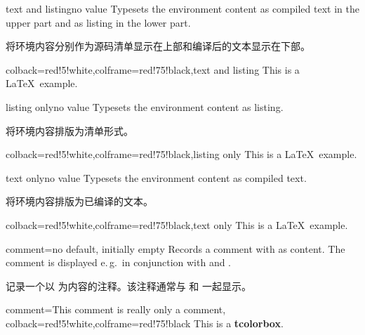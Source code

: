 \begin{docTcbKey}{text and listing}{}{no value}
Typesets the environment content as compiled text in the upper part and
as listing in the lower part.

将环境内容分别作为源码清单显示在上部和编译后的文本显示在下部。
\begin{dispExample}
\begin{tcblisting}{colback=red!5!white,colframe=red!75!black,text and listing}
This is a \LaTeX\ example.
\end{tcblisting}
\end{dispExample}
\end{docTcbKey}


\begin{docTcbKey}{listing only}{}{no value}
Typesets the environment content as listing.

将环境内容排版为清单形式。
\begin{dispExample}
\begin{tcblisting}{colback=red!5!white,colframe=red!75!black,listing only}
This is a \LaTeX\ example.
\end{tcblisting}
\end{dispExample}
\end{docTcbKey}


\begin{docTcbKey}{text only}{}{no value}
Typesets the environment content as compiled text.

将环境内容排版为已编译的文本。
\begin{dispExample}
\begin{tcblisting}{colback=red!5!white,colframe=red!75!black,text only}
This is a \LaTeX\ example.
\end{tcblisting}
\end{dispExample}
\end{docTcbKey}



\begin{docTcbKey}{comment}{=}{no default, initially empty}
Records a comment with  as content. The comment is displayed
e.\,g.\ in conjunction with 
and .

记录一个以  为内容的注释。该注释通常与  和  一起显示。
\begin{dispExample}
\begin{tcblisting}{comment={This comment is really only a comment},
colback=red!5!white,colframe=red!75!black}
This is a \textbf{tcolorbox}.
\end{tcblisting}
\end{dispExample}
\end{docTcbKey}


